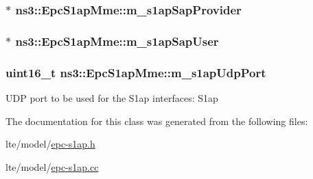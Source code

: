 \subsubsection[{\texorpdfstring{m\+\_\+s1ap\+Sap\+Provider}{m_s1apSapProvider}}]{$\ast$ ns3\+::\+Epc\+S1ap\+Mme\+::m\+\_\+s1ap\+Sap\+Provider\hspace{0.3cm}{\ttfamily [protected]}}\hypertarget{classns3_1_1EpcS1apMme_a2636a7928a3bd4bef46f629b3555c9d9}{}\label{classns3_1_1EpcS1apMme_a2636a7928a3bd4bef46f629b3555c9d9}
\subsubsection[{\texorpdfstring{m\+\_\+s1ap\+Sap\+User}{m_s1apSapUser}}]{$\ast$ ns3\+::\+Epc\+S1ap\+Mme\+::m\+\_\+s1ap\+Sap\+User\hspace{0.3cm}{\ttfamily [protected]}}\hypertarget{classns3_1_1EpcS1apMme_ab9994a301789a31ce3c324f80266619b}{}\label{classns3_1_1EpcS1apMme_ab9994a301789a31ce3c324f80266619b}
\subsubsection[{\texorpdfstring{m\+\_\+s1ap\+Udp\+Port}{m_s1apUdpPort}}]{\setlength{\rightskip}{0pt plus 5cm}uint16\+\_\+t ns3\+::\+Epc\+S1ap\+Mme\+::m\+\_\+s1ap\+Udp\+Port\hspace{0.3cm}{\ttfamily [private]}}\hypertarget{classns3_1_1EpcS1apMme_a5e2c2bf88a5bab4629e9b38ccdf48e53}{}\label{classns3_1_1EpcS1apMme_a5e2c2bf88a5bab4629e9b38ccdf48e53}
U\+DP port to be used for the S1ap interfaces\+: S1ap 

The documentation for this class was generated from the following files\+:\begin{DoxyCompactItemize}
\item 
lte/model/\hyperlink{epc-s1ap_8h}{epc-\/s1ap.\+h}\item 
lte/model/\hyperlink{epc-s1ap_8cc}{epc-\/s1ap.\+cc}\end{DoxyCompactItemize}
